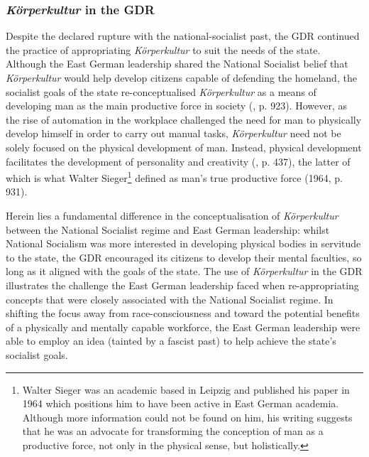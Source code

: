 \subsubsection*{\textit{Körperkultur} in the GDR}

Despite the declared rupture with the national-socialist past, the GDR continued the practice of appropriating \textit{Körperkultur} to suit the needs of the state. Although the East German leadership shared the National Socialist belief that \textit{Körperkultur} would help develop citizens capable of defending the homeland, the socialist goals of the state re-conceptualised \textit{Körperkultur} as a means of developing man as the main productive force in society (\cite{sieger1964}, p. 923). However, as the rise of automation in the workplace challenged the need for man to physically develop himself in order to carry out manual tasks, \textit{Körperkultur} need not be solely focused on the physical development of man. Instead, physical development facilitates the development of personality and creativity (\cite{bobnewa1963}, p. 437), the latter of which is what Walter Sieger\footnote{Walter Sieger was an academic based in Leipzig and published his paper in 1964 which positions him to have been active in East German academia. Although more information could not be found on him, his writing suggests that he was an advocate for transforming the conception of man as a productive force, not only in the physical sense, but holistically.} defined as man’s true productive force (1964, p. 931).

Herein lies a fundamental difference in the conceptualisation of \textit{Körperkultur} between the National Socialist regime and East German leadership: whilst National Socialism was more interested in developing physical bodies in servitude to the state, the GDR encouraged its citizens to develop their mental faculties, so long as it aligned with the goals of the state. The use of \textit{Körperkultur} in the GDR illustrates the challenge the East German leadership faced when re-appropriating concepts that were closely associated with the National Socialist regime. In shifting the focus away from race-consciousness and toward the potential benefits of a physically and mentally capable workforce, the East German leadership were able to employ an idea (tainted by a fascist past) to help achieve the state’s socialist goals.

